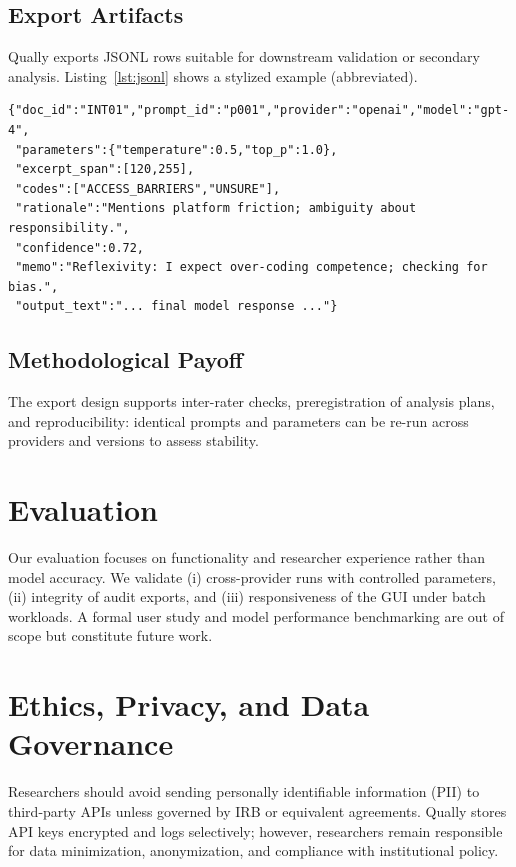 \documentclass[11pt,a4paper]{article}
\begin{document}
\subsection{Export Artifacts}
Qually exports JSONL rows suitable for downstream validation or secondary analysis. Listing~\ref{lst:jsonl} shows a stylized example (abbreviated).
\begin{lstlisting}[language={},basicstyle=\ttfamily\small,frame=single,caption={Abbreviated JSONL export for audit-ready analysis},label={lst:jsonl}]
{"doc_id":"INT01","prompt_id":"p001","provider":"openai","model":"gpt-4",
 "parameters":{"temperature":0.5,"top_p":1.0},
 "excerpt_span":[120,255],
 "codes":["ACCESS_BARRIERS","UNSURE"],
 "rationale":"Mentions platform friction; ambiguity about responsibility.",
 "confidence":0.72,
 "memo":"Reflexivity: I expect over-coding competence; checking for bias.",
 "output_text":"... final model response ..."}
\end{lstlisting}

\subsection{Methodological Payoff}
The export design supports inter-rater checks, preregistration of analysis plans, and reproducibility: identical prompts and parameters can be re-run across providers and versions to assess stability.

\section{Evaluation}
\label{sec:evaluation}
Our evaluation focuses on functionality and researcher experience rather than model accuracy. We validate (i) cross-provider runs with controlled parameters, (ii) integrity of audit exports, and (iii) responsiveness of the GUI under batch workloads. A formal user study and model performance benchmarking are out of scope but constitute future work.

\section{Ethics, Privacy, and Data Governance}
\label{sec:ethics}
Researchers should avoid sending personally identifiable information (PII) to third-party APIs unless governed by IRB or equivalent agreements. Qually stores API keys encrypted and logs selectively; however, researchers remain responsible for data minimization, anonymization, and compliance with institutional policy.
\end{document}
